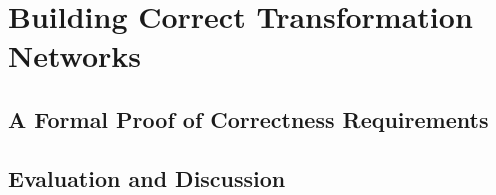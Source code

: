 \part{Building Correct Transformation Networks }


\chapter{A Formal Proof of Correctness Requirements
}





\chapter{Evaluation and Discussion }